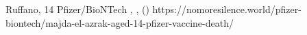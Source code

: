           {Ruffano, }
          {14}
          {Pfizer/BioNTech}
          {, }
          {
            ,
             ()
          }
          {https://nomoresilence.world/pfizer-biontech/majda-el-azrak-aged-14-pfizer-vaccine-death/}


